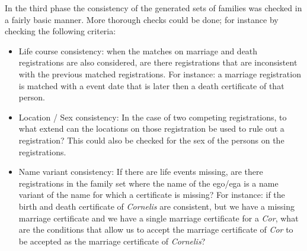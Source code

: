 In the third phase the consistency of the generated sets of families was checked in a fairly basic manner. More thorough checks could be done; for instance by checking the following criteria:
\begin{itemize}
	\item Life course consistency: when the matches on marriage and death registrations are also considered, are there registrations that are inconsistent with the previous matched registrations. For instance: a marriage registration is matched with a event date that is later then a death certificate of that person.
	\item Location / Sex consistency: In the case of two competing registrations, to what extend can the locations on those registration be used to rule out a registration? This could also be checked for the sex of the persons on the registrations.
	\item Name variant consistency: If there are life events missing, are there registrations in the family set where the name of the ego/ega is a name variant of the name for which a certificate is missing? For instance: if the birth and death certificate of \textit{Cornelis} are consistent, but we have a missing marriage certificate and we have a single marriage certificate for a \textit{Cor}, what are the conditions that allow us to accept the marriage certificate of \textit{Cor} to be accepted as the marriage certificate of \textit{Cornelis}?
\end{itemize}